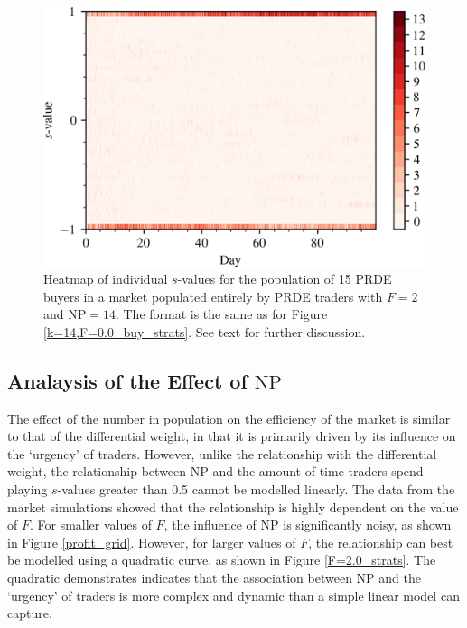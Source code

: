 \documentclass[conference]{IEEEtran}
\begin{document}
\begin{figure}[htbp]
    \centerline{\includegraphics[width=\columnwidth]{k=14,F=2.0_buy_strats.png}}
    \caption{
        Heatmap of individual $s$-values for the population of 15 PRDE buyers in a market populated entirely by PRDE traders with $F=2$ and $\mathrm{NP}=14$.
        The format is the same as for Figure \ref{k=14,F=0.0_buy_strats}.
        See text for further discussion.
    }
    \label{k=14,F=2.0_buy_strats}
\end{figure}

\subsection{Analaysis of the Effect of $\mathrm{NP}$}

The effect of the number in population on the efficiency of the market is similar to that of the differential weight, in that it is primarily driven by its influence on the `urgency' of traders.
However, unlike the relationship with the differential weight, the relationship between $\mathrm{NP}$ and the amount of time traders spend playing $s$-values greater than 0.5 cannot be modelled linearly.
The data from the market simulations showed that the relationship is highly dependent on the value of $F$.
For smaller values of $F$, the influence of $\mathrm{NP}$ is significantly noisy, as shown in Figure \ref{profit_grid}.
However, for larger values of $F$, the relationship can best be modelled using a quadratic curve, as shown in Figure  \ref{F=2.0_strats}.
The quadratic demonstrates indicates that the association between $\mathrm{NP}$ and the `urgency' of traders is more complex and dynamic than a simple linear model can capture.
\end{document}
